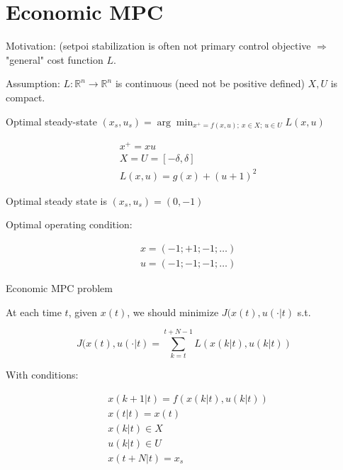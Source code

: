 \section{Economic MPC}

Motivation: (setpoi stabilization is often not primary control objective 
$\Rightarrow$ "general" cost function $L$.

Assumption: $L:\mathbb{R}^n\rightarrow\mathbb{R}^n$ is continuous (need not
be positive defined) $X,U$ is compact.

\begin{Definition}
 Optimal steady-state $(x_s,u_s)=\arg\min_{x^+=f(x,u);\ x\in X;\ u\in U}L(x,u)$
\end{Definition}

\begin{Example}
 \begin{equation*}
  \begin{split}
   &x^+=xu \\
   &X=U=[-\delta,\delta] \\
   &L(x,u)=g(x)+(u+1)^2
  \end{split}
 \end{equation*}

 Optimal steady state is $(x_s,u_s)=(0,-1)$

 Optimal operating condition:

 \begin{equation*}
  \begin{split}
   &x=(-1;+1;-1;\dots) \\
   &u=(-1;-1;-1;\dots)
  \end{split}
 \end{equation*}
\end{Example}


Economic MPC problem

At each time $t$, given $x(t)$, we should minimize $J(x(t),u(\cdot|t)$ s.t.

$$J(x(t),u(\cdot|t) = \sum_{k=t}^{t+N-1}L(x(k|t),u(k|t))$$

With conditions:

\begin{equation*}
 \begin{split}
  &x(k+1|t) = f(x(k|t),u(k|t)) \\
  &x(t|t) = x(t) \\
  &x(k|t)\in X \\
  &u(k|t)\in U \\
  &x(t+N|t) = x_s
 \end{split}
\end{equation*}

